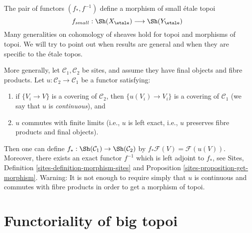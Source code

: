 \noindent
The pair of functors $(f_*, f^{-1})$ define a morphism of small \'etale topoi
$$
f_{small} :
\Sh(X_\etale)
\longrightarrow
\Sh(Y_\etale)
$$
Many generalities on cohomology of sheaves hold for topoi and
morphisms of topoi. We will try to point out when results are
general and when they are specific to the \'etale topos.

\begin{remark}
\label{remark-functoriality-general}
More generally, let $\mathcal{C}_1, \mathcal{C}_2$ be sites, and
assume they have final objects and fibre products. Let
$u: \mathcal{C}_2 \to \mathcal{C}_1$ be a functor satisfying:
\begin{enumerate}
\item if $\{V_i \to V\}$ is a covering of $\mathcal{C}_2$, then
$\{u(V_i) \to V_i\}$ is a covering of $\mathcal{C}_1$ (we
say that $u$ is {\it continuous}), and
\item $u$ commutes with finite limits (i.e., $u$ is left exact, i.e.,
$u$ preserves fibre products and final objects).
\end{enumerate}
Then one can define
$f_*: \Sh(\mathcal{C}_1) \to \Sh(\mathcal{C}_2)$
by $ f_* \mathcal{F}(V) = \mathcal{F}(u(V))$.
Moreover, there exists an exact functor $f^{-1}$ which
is left adjoint to $f_*$, see
Sites, Definition \ref{sites-definition-morphism-sites} and
Proposition \ref{sites-proposition-get-morphism}.
Warning: It is not enough to require simply that $u$ is continuous
and commutes with fibre products in order to get a morphism of topoi.
\end{remark}




\section{Functoriality of big topoi}
\label{section-functoriality-big-topoi}

